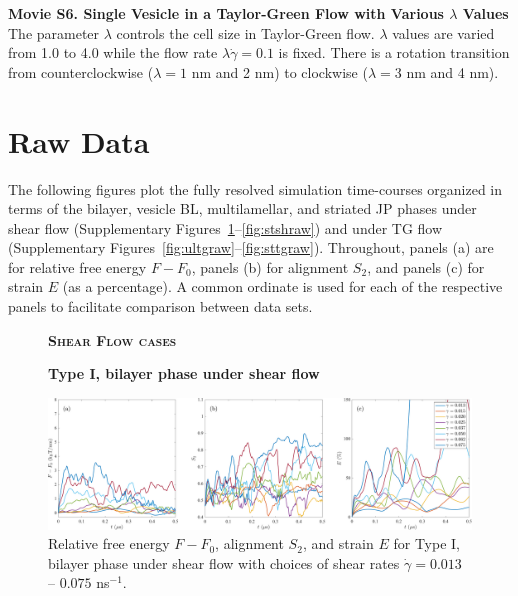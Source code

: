 \noindent
{\bf Movie S6. Single Vesicle in a Taylor-Green Flow with Various $\lambda$ Values} 
The parameter $\lambda$ controls the cell size in Taylor-Green flow. 
$\lambda$ values are varied from 1.0 to 4.0 while the flow rate $\lambda\dot\gamma=0.1$ is fixed. There is a rotation transition from counterclockwise ($\lambda=1$ nm and  2 nm) to clockwise ($\lambda=3$ nm and 4 nm). \\





\section{Raw Data}
The following figures plot the fully resolved simulation time-courses
organized in terms of the bilayer, vesicle BL, multilamellar, and striated JP phases
under shear flow (Supplementary Figures~\ref{fig:ulshraw}--\ref{fig:stshraw})
and under TG flow (Supplementary Figures~\ref{fig:ultgraw}--\ref{fig:sttgraw}).
Throughout, panels (a) are for relative free energy $F - F_0$,
panels (b) for alignment $S_2$, and panels (c) for strain $E$ (as a percentage). 
A common ordinate is used for each of the respective panels to facilitate
comparison between data sets. 

\begin{figure}[h!]
\begin{center}
\textbf{\textsc{Shear Flow cases}}\par\medskip
\textbf{Type I, bilayer phase under shear flow}\par\medskip
\includegraphics[width=\textwidth]{SMFigures/ULShRaw.pdf}
\end{center}
\caption{
Relative free energy $F - F_0$,
alignment $S_2$, and strain $E$ for
Type I, bilayer phase under shear flow with choices of shear rates $\dot\gamma=0.013$ -- $0.075$ ns$^{-1}$.
}
\label{fig:ulshraw}
\end{figure}


